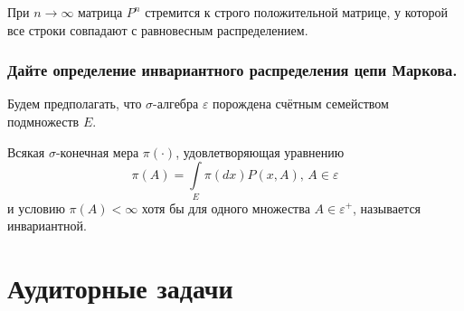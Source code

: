 При $n \to \infty $ матрица $P^n$ стремится к строго положительной матрице,
у которой все строки совпадают с равновесным распределением.

\subsubsection*{Дайте определение инвариантного распределения цепи Маркова.}

Будем предполагать,
что $ \sigma $-алгебра $ \varepsilon $ порождена счётным семейством подмножеств $E$.

Всякая $ \sigma $-конечная мера $ \pi \left( \cdot \right) $, удовлетворяющая уравнению
\begin{equation*}
  \pi \left( A \right) = \int \limits_{E} \pi \left( dx \right) P \left( x, A \right), \,
  A \in \varepsilon
\end{equation*}
и условию $ \pi \left( A \right) < \infty $ хотя бы для одного множества $A \in \varepsilon^+$,
называется инвариантной.

\section*{Аудиторные задачи}
